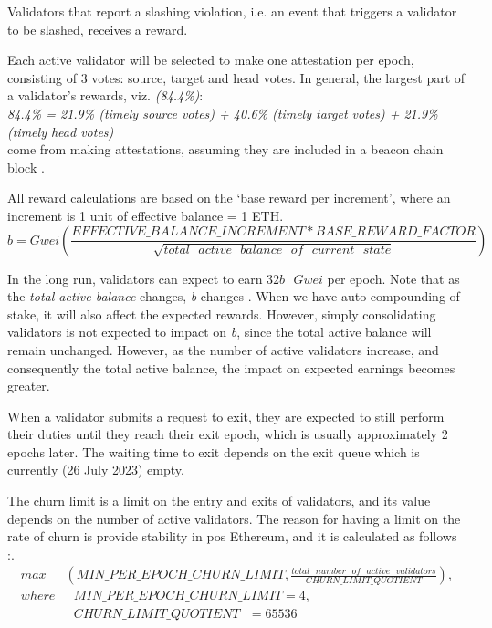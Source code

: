 \documentclass[UTF8]{article}
\begin{document}
{Validators that report a slashing violation, i.e. an event that triggers a validator to be slashed, receives a reward. 

Each active validator will be selected to make one attestation per epoch, consisting of 3 votes: source, target and head votes. 
In general, the largest part of a validator's rewards, viz. \textit{(84.4\%)}: \\
\textit{84.4\% = 21.9\% (timely source votes) + 40.6\% (timely target votes) +  21.9\% (timely head votes)}\\
come from making attestations, assuming they are included in a beacon chain block \cite{Edgington2023}. 

All reward calculations are based on the `base reward per increment', where an increment is 1 unit of effective balance = 1 ETH.
\begin{equation*}
 b = Gwei \left( \frac{EFFECTIVE\_BALANCE\_INCREMENT * BASE\_REWARD\_FACTOR}{\sqrt {total \texttt{ } active \texttt{ } balance  \texttt{ } of  \texttt{ } current  \texttt{ } state}} \right)
\end{equation*}

In the long run, validators can expect to earn $32b \texttt{ } Gwei$ per epoch. Note that as the \textit{total active balance} changes, \textit{b} changes  \cite{Edgington2023}. When we have auto-compounding of stake, it will also affect the expected rewards. However, simply consolidating validators is not expected to impact on \textit{b}, since the total active balance will remain unchanged. However, as the number of active validators increase, and consequently the total active balance, the impact on expected earnings becomes greater.

When a validator submits a request to exit, they are expected to still perform their duties until they reach their exit epoch, which is usually approximately 2 epochs later. The waiting time to exit depends on the exit queue which is currently (26 July 2023) empty. 

The churn limit is a limit on the entry and exits of validators, and its value depends on the number of active validators. The reason for having a limit on the rate of churn is provide stability in \gls{pos} Ethereum, and it is calculated as follows \cite{Edgington2023}:.
\begin{equation*}
\begin{aligned}
max & \left( MIN\_PER\_EPOCH\_CHURN\_LIMIT, \frac{total \texttt{ } number  \texttt{ } of  \texttt{ } active  \texttt{ } validators}{CHURN\_LIMIT\_QUOTIENT} \right),\\
where & \texttt{ }  MIN\_PER\_EPOCH\_CHURN\_LIMIT = 4, \\
 &  \texttt{ } CHURN\_LIMIT\_QUOTIENT  \texttt{              }= 65536
\end{aligned}
\end{equation*}

}
\end{document}
